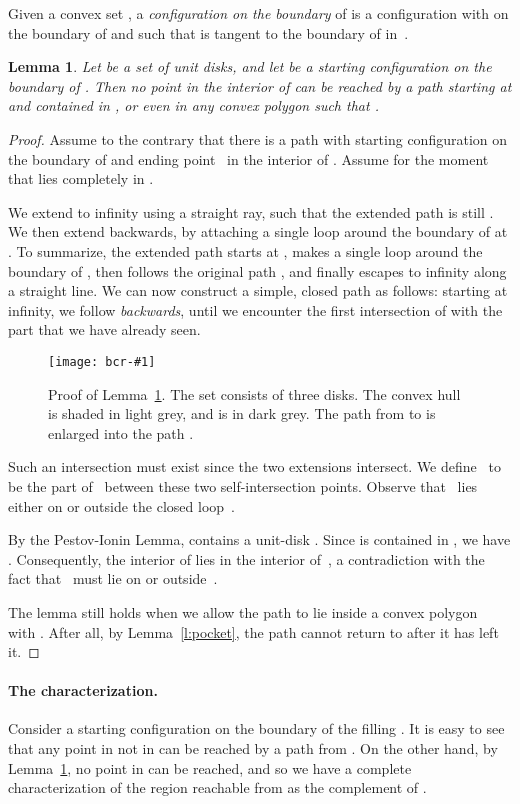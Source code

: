 \documentclass[a4paper]{article}
\newtheorem{lemma}[theorem]{Lemma}
\newcommand{\epsfigure}[2]{
  \begin{figure}[htb]
    \centerline{\texttt{[image: bcr-\#1]}}
    \caption{#2}
    \label{f:#1}
  \end{figure}}
\begin{document}
Given a convex set , a \emph{configuration on the boundary} of 
is a configuration  with  on the boundary of 
and such that  is tangent to the boundary of  in~.
\begin{lemma}\label{l:nonreach}
  Let  be a set of unit disks, and let  be a starting
  configuration on the boundary of . Then no point in
  the interior of  can be reached by a path starting at
   and contained in , or even in any convex
  polygon  such that .
\end{lemma}
\begin{proof}
  Assume to the contrary that there is a path  with starting
  configuration  on the boundary of  and
  ending point~ in the interior of .  Assume for the
  moment that  lies completely in .  
  
  We extend  to infinity using a straight ray, such that the
  extended path is still .  We then extend  backwards,
  by attaching a single loop around the boundary of
   at . To summarize, the extended path
   starts at , makes a single loop around the boundary
  of , then follows the original path , and
  finally escapes to infinity along a straight line.  We can now
  construct a simple, closed path  as follows: starting at
  infinity, we follow  \emph{backwards}, until we encounter
  the first intersection of  with the part that we have
  already seen.  
\epsfigure{udisks}{Proof of Lemma~\ref{l:nonreach}. The set 
    consists of three disks. The convex hull  is shaded in
    light grey, and  is in dark grey.  The path  from
     to  is enlarged into the path .}
Such an intersection must exist since the two
  extensions intersect.  We define~ to be the part of~
  between these two self-intersection points.
  Observe that~ lies either on or outside the closed loop~.
  
  By the Pestov-Ionin Lemma,  contains a unit-disk . 
  Since  is contained in , we have . Consequently, the interior of  lies in the
  interior of~, a contradiction with the fact that~ must lie
  on or outside~.

  The lemma still holds when we allow the path to lie inside a convex
  polygon~ with .  After all, by
  Lemma~\ref{l:pocket}, the path cannot return to  after it
  has left it.
\end{proof}

\paragraph{The characterization.}
Consider a starting configuration  on the boundary of the
filling .  It is easy to see that any point in  not in
 can be reached by a path from .  On the other
hand, by Lemma~\ref{l:nonreach}, no point in 
can be reached, and so we have a complete characterization of the
region reachable from  as the complement of .
\end{document}

